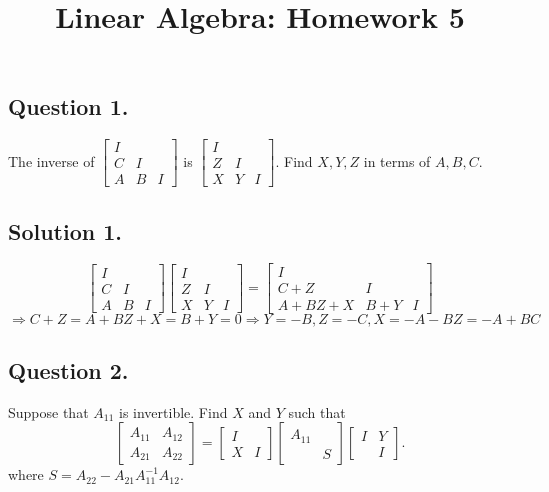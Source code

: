 \documentclass{article}
\title{Linear Algebra: Homework 5}
\begin{document}
\maketitle
\subsection*{Question 1.}
The inverse of $\left[\begin{array}{ccc}I\\C&I\\A&B&I\end{array}\right]$ is $\left[\begin{array}{ccc}I\\Z&I\\X&Y&I\end{array}\right]$. Find $X,Y,Z$ in terms of $A,B,C$.
\subsection*{Solution 1.}
\[\left[\begin{array}{ccc}I\\C&I\\A&B&I\end{array}\right]\left[\begin{array}{ccc}I\\Z&I\\X&Y&I\end{array}\right]=\left[\begin{array}{ccc}I\\C+Z&I\\A+BZ+X&B+Y&I\end{array}\right]\]
\[\Rightarrow C+Z=A+BZ+X=B+Y=0\Rightarrow Y=-B,Z=-C,X=-A-BZ=-A+BC\]
\subsection*{Question 2.}
Suppose that $A_{11}$ is invertible. Find $X$ and $Y$ such that
\[\left[\begin{array}{cc}A_{11}&A_{12}\\A_{21}&A_{22}\end{array}\right]=\left[\begin{array}{cc}I\\X&I\end{array}\right]\left[\begin{array}{cc}A_{11}\\&S\end{array}\right]\left[\begin{array}{cc}I&Y\\&I\end{array}\right].\]
where $S=A_{22}-A_{21}A_{11}^{-1}A_{12}$.
\end{document}
